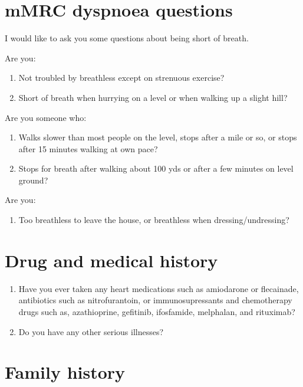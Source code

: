 \documentclass[a4paper,10pt]{article}
\begin{document}
\section{mMRC dyspnoea questions} 

I would like to ask you some questions about being short of breath.

Are you:

\begin{enumerate}
\item Not troubled by breathless except on strenuous exercise?
\item Short of breath when hurrying on a level or when walking up a slight hill?
\end{enumerate}

Are you someone who:

\begin{enumerate}[resume]
\item Walks slower than most people on the level, stops after a mile or so, or stops after 15 minutes walking at own pace?
\item Stops for breath after walking about 100 yds or after a few minutes on level ground?
\end{enumerate}

Are you:

\begin{enumerate}[resume]
\item Too breathless to leave the house, or breathless when dressing/undressing?
\end{enumerate}

\section{Drug and medical history}

\begin{enumerate}
\item Have you ever taken any heart medications such as amiodarone or flecainade, antibiotics such as nitrofurantoin, or immunosupressants and chemotherapy drugs such as, azathioprine, gefitinib, ifosfamide, melphalan, and rituximab? %
\item Do you have any other serious illnesses?
\end{enumerate}

\section{Family history}
\end{document}
